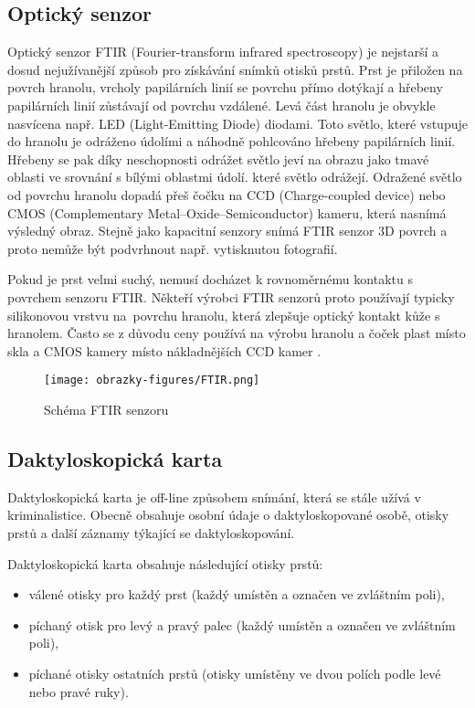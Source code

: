\subsection{Optický senzor}
Optický senzor FTIR (Fourier-transform infrared spectroscopy) je nejstarší a dosud nejužívanější způsob pro získávání snímků otisků prstů. Prst je přiložen na povrch hranolu, vrcholy papilárních linií se povrchu přímo dotýkají a hřebeny papilárních linií zůstávají od povrchu vzdálené. Levá část hranolu je obvykle nasvícena např. LED (Light-Emitting Diode) diodami. Toto světlo, které vstupuje do hranolu je odráženo údolími a náhodně pohlcováno hřebeny papilárních linií. Hřebeny se pak díky neschopnosti odrážet světlo jeví na obrazu jako tmavé oblasti ve srovnání s bílými oblastmi údolí. které světlo odrážejí. Odražené světlo od povrchu hranolu dopadá přeš čočku na CCD (Charge-coupled device) nebo CMOS (Complementary Metal–Oxide–Semiconductor) kameru, která nasnímá výsledný obraz. Stejně jako kapacitní senzory snímá FTIR senzor 3D povrch a proto nemůže být podvrhnout např. vytisknutou fotografií.

Pokud je prst velmi suchý, nemusí docházet k rovnoměrnému kontaktu s povrchem senzoru FTIR. Někteří výrobci FTIR senzorů proto používají typicky silikonovou vrstvu na~povrchu hranolu, která zlepšuje optický kontakt kůže s hranolem. Často se z důvodu ceny používá na výrobu hranolu a čoček plast místo skla a CMOS kamery místo nákladnějších CCD kamer \cite{Maltoni2009}.

\begin{figure}[!htbp]
    \centering
    \texttt{[image: obrazky-figures/FTIR.png]}
    \caption{Schéma FTIR senzoru \cite{Maltoni2009}}
\end{figure}
\subsection{Daktyloskopická karta}
Daktyloskopická karta je off-line způsobem snímání, která se stále užívá v kriminalistice. Obecně obsahuje osobní údaje o daktyloskopované osobě, otisky prstů a další záznamy týkající se daktyloskopování.

Daktyloskopická karta obsahuje následující otisky prstů:
\begin{itemize}
    \item válené otisky pro každý prst (každý umístěn a označen ve zvláštním poli),
    \item píchaný otisk pro levý a pravý palec (každý umístěn a označen ve zvláštním poli),
    \item píchané otisky ostatních prstů (otisky umístěny ve dvou polích podle levé nebo pravé ruky).
\end{itemize}

